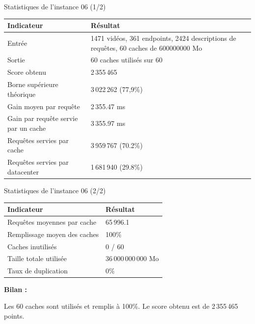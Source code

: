 \documentclass[aspectratio=169,xcolor=table]{pres}
\begin{document}
\begin{frame}{Statistiques de l'instance 06 (1/2)}
  \centering
  \small
  \vfill

  \begin{tabular}{|l|p{8cm}|}
      \hline
      \textbf{Indicateur} & \textbf{Résultat} \\
      \hline
      Entrée & 1471 vidéos, 361 endpoints, 2424 descriptions de requêtes, 60 caches de 600000000 Mo \\
      \hline
      Sortie & 60 caches utilisés sur 60 \\
      \hline
      Score obtenu & 2\,355\,465 \\
      \hline
      Borne supérieure théorique & 3\,022\,262 (77,9\%) \\
      \hline
      Gain moyen par requête & 2\,355.47 ms \\
      \hline
      Gain par requête servie par un cache & 3\,355.97 ms \\
      \hline
      Requêtes servies par cache & 3\,959\,767 (70.2\%) \\
      \hline
      Requêtes servies par datacenter & 1\,681\,940 (29.8\%) \\
      \hline
  \end{tabular}

  \vfill
\end{frame}

\begin{frame}{Statistiques de l'instance 06 (2/2)}
  \centering
  \small
  \vfill

  \begin{tabular}{|l|p{8cm}|}
      \hline
      \textbf{Indicateur} & \textbf{Résultat} \\
      \hline
      Requêtes moyennes par cache & 65\,996.1 \\
      \hline
      Remplissage moyen des caches & 100\% \\
      \hline
      Caches inutilisés & 0 / 60 \\
      \hline
      Taille totale utilisée & 36\,000\,000\,000 Mo \\
      \hline
      Taux de duplication & 0\% \\
      \hline
  \end{tabular}

  \vspace{0.6cm}

  \textbf{Bilan :}
  
  Les 60 caches sont utilisés et remplis à 100\%.
  Le score obtenu est de 2\,355\,465 points.

  \vfill
\end{frame}
\end{document}
